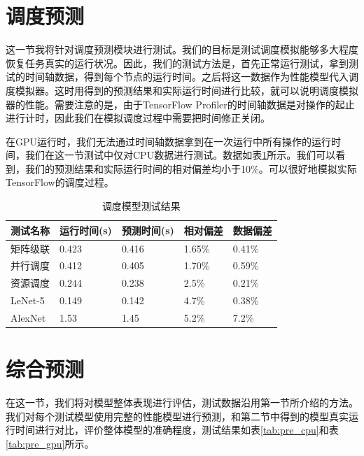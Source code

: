 \section{调度预测}
    这一节我将针对调度预测模块进行测试。我们的目标是测试调度模拟能够多大程度恢复任务真实的运行状况。因此，我们的测试方法是，首先正常运行测试，拿到测试的时间轴数据，得到每个节点的运行时间。之后将这一数据作为性能模型代入调度模拟器。这时用得到的预测结果和实际运行时间进行比较，就可以说明调度模拟器的性能。需要注意的是，由于TensorFlow Profiler的时间轴数据是对操作的起止进行计时，因此我们在模拟调度过程中需要把时间修正关闭。
    
    在GPU运行时，我们无法通过时间轴数据拿到在一次运行中所有操作的运行时间，我们在这一节测试中仅对CPU数据进行测试。数据如表\ref{tab:sche}所示。我们可以看到，我们的预测结果和实际运行时间的相对偏差均小于10\%。可以很好地模拟实际TensorFlow的调度过程。
    
    \begin{table}[!htbp]
        \centering
	    \caption{调度模型测试结果}
        \label{tab:sche}
        \begin{tabular}{|l|l|l|l|l|}
            \hline
            测试名称 & 运行时间(s) & 预测时间(s) & 相对偏差 & 数据偏差\\
            \hline
            矩阵级联 & 0.423 & 0.416 & 1.65\% & 0.41\% \\
            \hline
            并行调度 & 0.412 & 0.405 & 1.70\% & 0.59\% \\
            \hline
            资源调度 & 0.244 & 0.238 & 2.5\% & 0.21\% \\
            \hline
            LeNet-5 & 0.149 & 0.142 & 4.7\% & 0.38\% \\
            \hline
            AlexNet & 1.53 & 1.45 & 5.2\% & 7.2\% \\
            \hline
        \end{tabular}
    \end{table}

\section{综合预测}
    在这一节，我们将对模型整体表现进行评估，测试数据沿用第一节所介绍的方法。我们对每个测试模型使用完整的性能模型进行预测，和第二节中得到的模型真实运行时间进行对比，评价整体模型的准确程度，测试结果如表\ref{tab:pre_cpu}和表\ref{tab:pre_gpu}所示。
    
